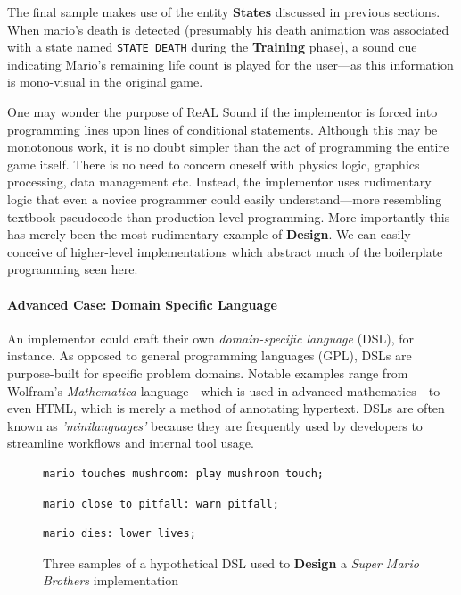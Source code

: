\documentclass{report}
\newcommand{\rs}{ReAL Sound\xspace}
\newcommand{\train}{\textbf{Training}\xspace}
\newcommand{\design}{\textbf{Design}\xspace}
\newcommand{\state}[1]{\textbf{#1}}
\newcommand{\imp}{implementor\xspace}
\begin{document}
The final sample makes use of the entity \state{States} discussed in previous sections. When mario's death is detected (presumably his death animation was associated with a state named \texttt{STATE\_DEATH} during the \train phase), a sound cue indicating Mario's remaining life count is played for the user---as this information is mono-visual in the original game. 


One may wonder the purpose of \rs if the \imp is forced into programming lines upon lines of conditional statements. Although this may be monotonous work, it is no doubt simpler than the act of programming the entire game itself. There is no need to concern oneself with physics logic, graphics processing, data management etc. Instead, the \imp uses rudimentary logic that even a novice programmer could easily understand---more resembling textbook pseudocode than production-level programming. More importantly this has merely been the most rudimentary example of \design. We can easily conceive of higher-level implementations which abstract much of the boilerplate programming seen here. 

\paragraph{Advanced Case: Domain Specific Language}
An \imp could craft their own \emph{domain-specific language} (DSL), for instance. As opposed to general programming languages (GPL), DSLs are purpose-built for specific problem domains\cite{DSL}. Notable examples range from Wolfram's \emph{Mathematica} language---which is used in advanced mathematics---to even HTML, which is merely a method of annotating hypertext. DSLs are often known as \emph{'minilanguages'} because they are frequently used by developers to streamline workflows and internal tool usage\cite{UnixProg}. 

\begin{figure}[h]

\lstset{language=Python}
\begin{lstlisting}[frame=single]
    mario touches mushroom: play mushroom touch;
\end{lstlisting}
    
\begin{lstlisting}[frame=single]
    mario close to pitfall: warn pitfall;
\end{lstlisting}

\begin{lstlisting}[frame=single]
    mario dies: lower lives;
\end{lstlisting}

    \caption{Three samples of a hypothetical DSL used to \design a \emph{Super Mario Brothers} implementation}
    \label{fig:dsl_examples}
\end{figure}
\end{document}
